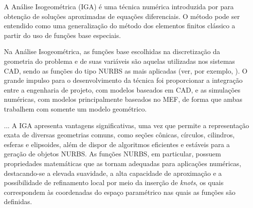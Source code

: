 \documentclass[tese_patricia]{subfiles}
\begin{document}


A Análise Isogeométrica (IGA) é uma técnica numérica introduzida por  para obtenção de soluções aproximadas de equações diferenciais. O método pode ser entendido como uma generalização do método dos elementos finitos clássico a partir do uso de funções base especiais. 

Na Análise Isogeométrica, as funções base escolhidas na discretização da geometria do problema e de suas variáveis são aquelas utilizadas nos sistemas CAD, sendo as funções do tipo NURBS as mais aplicadas (ver, por exemplo, ). O grande impulso para o desenvolvimento da técnica foi proporcionar a integração entre a engenharia de projeto, com modelos baseados em CAD, e as simulações numéricas, com modelos principalmente baseados no MEF, de forma que ambas trabalhem com somente um modelo geométrico.

\aquiiii...
A IGA apresenta vantagens significativas, uma vez que permite a representação exata de diversas geometrias comuns, como seções cônicas, círculos, cilindros, esferas e elipsoides, além de dispor de algoritmos eficientes e estáveis para a geração de objetos NURBS. As funções NURBS, em particular, possuem propriedades matemáticas que as tornam adequadas para aplicações numéricas, destacando-se a elevada suavidade, a alta capacidade de aproximação e a possibilidade de refinamento local por meio da inserção de \textit{knots}, os quais correspondem às coordenadas do espaço paramétrico nas quais as funções são definidas.
\end{document}
